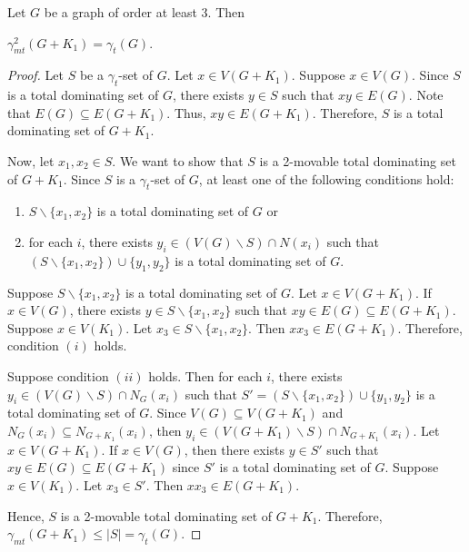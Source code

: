 \documentclass[10pt,a4paper]{amsart}
\begin{document}
\begin{theorem}\label{Thm:15}\rm
	Let $G$ be a graph of order at least 3. Then
	\begin{center}
		$\gamma_{mt}^2 (G+K_1)=\gamma_t (G)$.
	\end{center}
\end{theorem}

\begin{proof}
	Let $S$ be a $\gamma_t$-set of $G$. Let $x \in V(G+K_1)$. Suppose $x \in V(G)$. Since $S$ is a total dominating set of $G$, there exists $y \in S$ such that $xy \in E(G)$. Note that $E(G) \subseteq E(G+K_1)$. Thus, $xy \in E(G+K_1)$. Therefore, $S$ is a total dominating set of $G+K_1$.
	
	Now, let $x_1, x_2 \in S$. We want to show that $S$ is a 2-movable total dominating set of $G+K_1$. Since $S$ is a $\gamma_t$-set of $G$, at least one of the following conditions hold:
	\begin{enumerate}
		\item[(i)] $S \backslash \{x_1, x_2\}$ is a total dominating set of $G$ or
		\item[(ii)] for each $i$, there exists $y_i \in (V(G) \backslash S) \cap N(x_i)$ such that $(S \backslash \{x_1, x_2\}) \cup \{y_1, y_2\}$ is a total dominating set of $G$.
	\end{enumerate}	 
	
	Suppose $S \backslash \{x_1,x_2\}$ is a total dominating set of $G$. Let $x \in V(G+K_1)$. If $x \in V(G)$, there exists $y \in S \backslash \{x_1,x_2\}$ such that $xy \in E(G) \subseteq E(G+K_1)$. Suppose $x \in V(K_1)$. Let $x_3 \in S \backslash \{x_1,x_2\}$. Then $xx_3 \in E(G+K_1)$. Therefore, condition $(i)$ holds.
	
	Suppose condition $(ii)$ holds. Then for each $i$, there exists\\
	$y_i \in (V(G) \backslash S) \cap N_G(x_i)$ such that $S'=(S \backslash \{x_1, x_2\}) \cup \{y_1, y_2\}$ is a total dominating set of $G$. Since $V(G) \subseteq V(G+K_1)$ and $N_G(x_i) \subseteq N_{G+K_1} (x_i)$, then $y_i \in (V(G+K_1) \backslash S) \cap N_{G+K_1}(x_i)$. Let $x \in V(G+K_1)$. If $x \in V(G)$, then there exists $y \in S'$ such that $xy \in E(G) \subseteq E(G+K_1)$ since $S'$ is a total dominating set of $G$. Suppose $x \in V(K_1)$. Let $x_3 \in S'$. Then $xx_3 \in E(G+K_1)$. 
	
	Hence, $S$ is a 2-movable total dominating set of $G+K_1$. Therefore,\\
	$\gamma_{mt} (G+K_1) \leq |S|=\gamma_t (G)$.
	

\end{proof}
\end{document}
